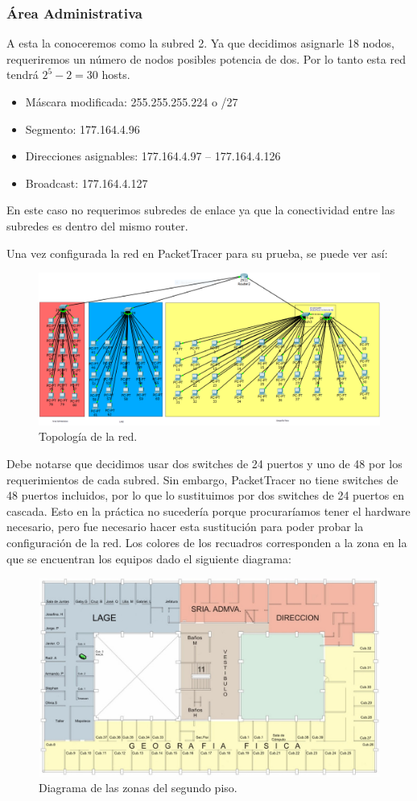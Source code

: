 \documentclass[../main.tex]{subfiles}
\begin{document}
\subsubsection*{Área Administrativa}
A esta la conoceremos como la subred 2. Ya que decidimos asignarle 18 nodos, requeriremos un número de nodos posibles potencia de dos. Por lo tanto esta red tendrá $2^5 - 2 = 30$ hosts. 
\begin{itemize}
\item Máscara modificada: 255.255.255.224 o /27
\item Segmento: 177.164.4.96
\item Direcciones asignables: 177.164.4.97 -- 177.164.4.126
\item Broadcast: 177.164.4.127
\end{itemize}
En este caso no requerimos subredes de enlace ya que la conectividad entre las subredes es dentro del mismo router.

Una vez configurada la red en PacketTracer para su prueba, se puede ver así:
\begin{figure}[H]
  \centering
  \includegraphics[width=\textwidth]{images/topologia.png}
  \caption{Topología de la red.}\label{fig:topo}
\end{figure}
Debe notarse que decidimos usar dos switches de 24 puertos y uno de 48 por los requerimientos de cada subred. Sin embargo, PacketTracer no tiene switches de 48 puertos incluidos, por lo que lo sustituimos por dos switches de 24 puertos en cascada. Esto en la práctica no sucedería porque procuraríamos tener el hardware necesario, pero fue necesario hacer esta sustitución para poder probar la configuración de la red. Los colores de los recuadros corresponden a la zona en la que se encuentran los equipos dado el siguiente diagrama:
\begin{figure}[H]
  \centering
  \includegraphics[width=\textwidth]{images/2p.jpg}
  \caption{Diagrama de las zonas del segundo piso.}\label{fig:topo}
\end{figure}
\end{document}
